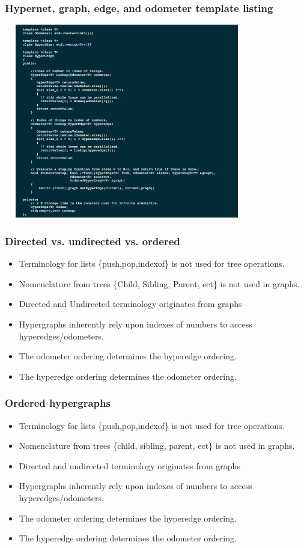 \documentclass{beamer}
\begin{document}
	
	\begin{frame}
	\frametitle{Hypernet, graph, edge, and odometer template listing}
	\includegraphics[width=10.75cm, height=8.5cm]{HypergraphCodeListing}
	\end{frame}	
	
	\begin{frame}
	\frametitle{Directed vs. undirected vs. ordered}
	\begin{itemize}
	\item Terminology for lists \{push,pop,indexof\} is not used for tree operations.
	\item Nomenclature from trees \{Child, Sibling, Parent, ect\} is not used in graphs.
	\item Directed and Undirected terminology originates from graphs
	\item Hypergraphs inherently rely upon indexes of numbers to access hyperedges/odometers.
	\item The odometer ordering determines the hyperedge ordering.
	\item The hyperedge ordering determines the odometer ordering.
	\end{itemize}
	\end{frame}
	
	\begin{frame}
	\frametitle{Ordered hypergraphs}
	\begin{itemize}
	\item Terminology for lists \{push,pop,indexof\} is not used for tree operations.
	\item Nomenclature from trees \{child, sibling, parent, ect\} is not used in graphs.
	\item Directed and undirected terminology originates from graphs
	\item Hypergraphs inherently rely upon indexes of numbers to access hyperedges/odometers.
	\item The odometer ordering determines the hyperedge ordering.
	\item The hyperedge ordering determines the odometer ordering.
	\end{itemize}
	\end{frame}
	
\end{document}
